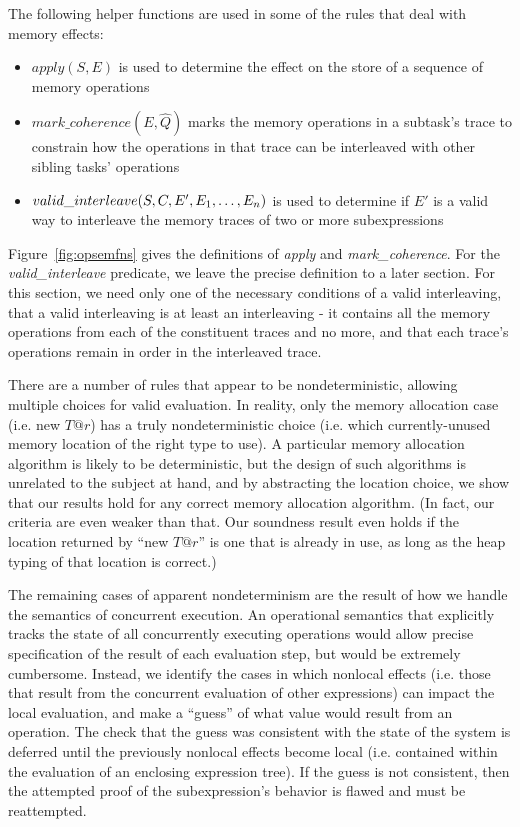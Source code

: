 \begin{itemize}
The following helper functions are used in some of the rules that deal with memory effects:
\begin{itemize}
\item $apply(S, E)$ is used to determine the effect on the store of a sequence of memory operations
\item $mark\_coherence(E, \hat Q)$ marks the memory operations in a subtask's trace to
constrain how the operations in that trace can be interleaved with other sibling tasks' operations
\item $valid\_interleave(S, C, E', {E}_1,\ldots,{E}_n)$ is used to determine if $E'$ is a valid way to
interleave the memory traces of two or more subexpressions
\end{itemize}
Figure~\ref{fig:opsemfns} gives the definitions of {\em apply} and {\em mark\_coherence}.  For
the {\em valid\_interleave} predicate, we leave the precise definition to a later section.  For this
section, we need only one of the necessary conditions of a valid interleaving, that a valid
interleaving is at least an interleaving - it contains all the memory operations from each of the
constituent traces and no more, and that each trace's operations remain in order in the interleaved
trace.
\end{itemize}

There are a number of rules that appear to be nondeterministic, allowing multiple choices for
valid evaluation.  In reality, only the memory allocation case (i.e. new $T@r$) has a truly
nondeterministic choice (i.e. which currently-unused memory location of the right type to 
use).  A particular memory allocation algorithm is likely to be deterministic, but the
design of such algorithms is unrelated to the subject at hand, and by abstracting the location 
choice, we show that our results hold for any correct memory allocation algorithm.  (In fact,
our criteria are even weaker than that.  Our soundness result even holds if the location returned
by ``new $T@r$'' is one that is already in use, as long as the heap typing of that location is
correct.)

The remaining cases of apparent nondeterminism are the result of how we handle the semantics of
concurrent execution.  An operational semantics that explicitly tracks the state of all 
concurrently executing operations would allow precise specification of the result of each 
evaluation step, but would be extremely cumbersome.  Instead, we identify the cases in which
nonlocal effects (i.e. those that result from the concurrent evaluation of other expressions)
can impact the local evaluation, and make a ``guess'' of what value would result from an 
operation.  The check that the guess was consistent with the state of the system is deferred until
the previously nonlocal effects become local (i.e. contained within the evaluation of an enclosing
expression tree).  If the guess is not consistent, then the attempted proof of the subexpression's
behavior is flawed and must be reattempted.

